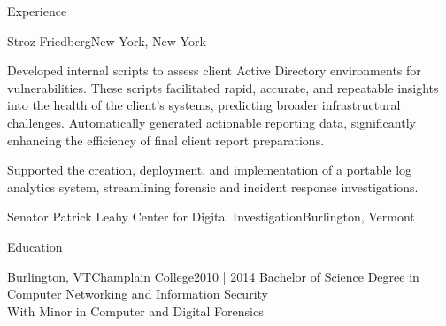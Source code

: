 \documentclass[]{mcdowellcv}
\begin{document}
\begin{cvsection}{Experience}
\begin{jobentry}{Stroz Friedberg}{New York, New York}
        \begin{jobprojects}
            \item Developed internal scripts to assess client Active Directory environments for vulnerabilities. These scripts facilitated rapid, accurate, and repeatable insights into the health of the client's systems, predicting broader infrastructural challenges. Automatically generated actionable reporting data, significantly enhancing the efficiency of final client report preparations.
            \item Supported the creation, deployment, and implementation of a portable log analytics system, streamlining forensic and incident response investigations.
        \end{jobprojects}
    \end{jobentry}

    \begin{jobentry}{Senator Patrick Leahy Center for Digital Investigation}{Burlington, Vermont}
        \begin{jobpositions}
        \end{jobpositions}
        
    \end{jobentry}

\end{cvsection}

\begin{cvsection}{Education}
    \begin{cvsubsection}{Burlington, VT}{Champlain College}{2010 | 2014}
        \vspace{-1em}Bachelor of Science Degree in Computer Networking and Information Security\\
        \hspace*{1em}With Minor in Computer and Digital Forensics
    \end{cvsubsection}
\end{cvsection}
\end{document}
